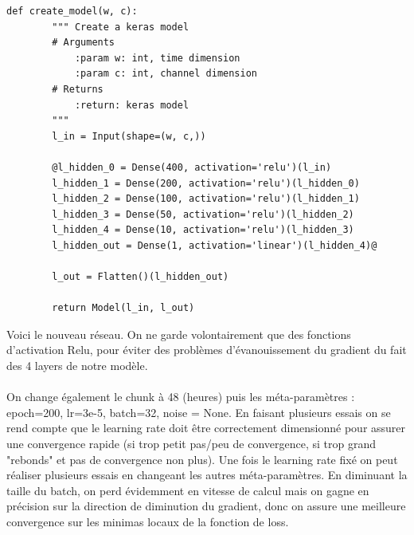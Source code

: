 \documentclass{article}
\begin{document}
    \begin{lstlisting}[frame=single]
        def create_model(w, c):
        """ Create a keras model
        # Arguments
            :param w: int, time dimension
            :param c: int, channel dimension
        # Returns
            :return: keras model
        """
        l_in = Input(shape=(w, c,))  
        
        @l_hidden_0 = Dense(400, activation='relu')(l_in)
        l_hidden_1 = Dense(200, activation='relu')(l_hidden_0)
        l_hidden_2 = Dense(100, activation='relu')(l_hidden_1)
        l_hidden_3 = Dense(50, activation='relu')(l_hidden_2)
        l_hidden_4 = Dense(10, activation='relu')(l_hidden_3)
        l_hidden_out = Dense(1, activation='linear')(l_hidden_4)@
        
        l_out = Flatten()(l_hidden_out)

        return Model(l_in, l_out)
    \end{lstlisting}
    Voici le nouveau réseau. On ne garde volontairement que des fonctions d'activation Relu, pour éviter des problèmes d'évanouissement du gradient du fait des 4 layers de notre modèle.\\\\On change également le chunk à 48 (heures) puis les méta-paramètres : epoch=200, lr=3e-5, batch=32, noise = None. En faisant plusieurs essais on se rend compte que le learning rate doit être correctement dimensionné pour assurer une convergence rapide (si trop petit pas/peu de convergence, si trop grand "rebonds" et pas de convergence non plus). Une fois le learning rate fixé on peut réaliser plusieurs essais en changeant les autres méta-paramètres. En diminuant la taille du batch, on perd évidemment en vitesse de calcul mais on gagne en précision sur la direction de diminution du gradient, donc on assure une meilleure convergence sur les minimas locaux de la fonction de loss.\\\\
    
\end{document}
